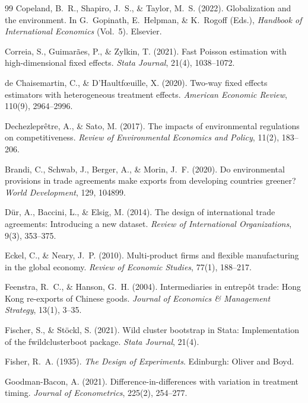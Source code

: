 \documentclass[12pt]{article}
\begin{document}
\begin{thebibliography}{99}
Copeland, B.~R., Shapiro, J.~S., \& Taylor, M.~S. (2022).
Globalization and the environment.
In G.~Gopinath, E.~Helpman, \& K.~Rogoff (Eds.), \textit{Handbook of International
Economics} (Vol.\ 5). Elsevier.

Correia, S., Guimarães, P., \& Zylkin, T. (2021).
Fast Poisson estimation with high-dimensional fixed effects.
\textit{Stata Journal}, 21(4), 1038--1072.

de Chaisemartin, C., \& D'Haultfœuille, X. (2020).
Two-way fixed effects estimators with heterogeneous treatment effects.
\textit{American Economic Review}, 110(9), 2964--2996.

Dechezleprêtre, A., \& Sato, M. (2017).
The impacts of environmental regulations on competitiveness.
\textit{Review of Environmental Economics and Policy}, 11(2), 183--206.

Brandi, C., Schwab, J., Berger, A., \& Morin, J.~F. (2020).
Do environmental provisions in trade agreements make exports from developing countries
greener?
\textit{World Development}, 129, 104899.

Dür, A., Baccini, L., \& Elsig, M. (2014).
The design of international trade agreements: Introducing a new dataset.
\textit{Review of International Organizations}, 9(3), 353--375.

Eckel, C., \& Neary, J.~P. (2010).
Multi-product firms and flexible manufacturing in the global economy.
\textit{Review of Economic Studies}, 77(1), 188--217.

Feenstra, R.~C., \& Hanson, G.~H. (2004).
Intermediaries in entrepôt trade: Hong Kong re-exports of Chinese goods.
\textit{Journal of Economics \& Management Strategy}, 13(1), 3--35.

Fischer, S., \& Stöckl, S. (2021).
Wild cluster bootstrap in Stata: Implementation of the fwildclusterboot package.
\textit{Stata Journal}, 21(4).

Fisher, R.~A. (1935).
\textit{The Design of Experiments}. Edinburgh: Oliver and Boyd.

Goodman-Bacon, A. (2021).
Difference-in-differences with variation in treatment timing.
\textit{Journal of Econometrics}, 225(2), 254--277.


\end{thebibliography}
\end{document}
